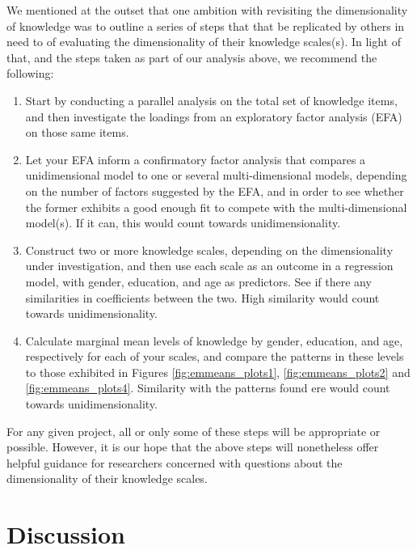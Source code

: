 \documentclass[11pt,halfline,a4paper,]{ouparticle}
\providecommand{\tightlist}{%
  \setlength{\itemsep}{0pt}\setlength{\parskip}{0pt}}
\begin{document}
We mentioned at the outset that one ambition with revisiting the
dimensionality of knowledge was to outline a series of steps that that
be replicated by others in need to of evaluating the dimensionality of
their knowledge scales(s). In light of that, and the steps taken as part
of our analysis above, we recommend the following:

\begin{enumerate}
\def\labelenumi{\arabic{enumi}.}
\tightlist
\item
  Start by conducting a parallel analysis on the total set of knowledge
  items, and then investigate the loadings from an exploratory factor
  analysis (EFA) on those same items.\\
\item
  Let your EFA inform a confirmatory factor analysis that compares a
  unidimensional model to one or several multi-dimensional models,
  depending on the number of factors suggested by the EFA, and in order
  to see whether the former exhibits a good enough fit to compete with
  the multi-dimensional model(s). If it can, this would count towards
  unidimensionality.\\
\item
  Construct two or more knowledge scales, depending on the
  dimensionality under investigation, and then use each scale as an
  outcome in a regression model, with gender, education, and age as
  predictors. See if there any similarities in coefficients between the
  two. High similarity would count towards unidimensionality.\\
\item
  Calculate marginal mean levels of knowledge by gender, education, and
  age, respectively for each of your scales, and compare the patterns in
  these levels to those exhibited in Figures \ref{fig:emmeans_plots1},
  \ref{fig:emmeans_plots2} and \ref{fig:emmeans_plots4}. Similarity with
  the patterns found ere would count towards unidimensionality.
\end{enumerate}

For any given project, all or only some of these steps will be
appropriate or possible. However, it is our hope that the above steps
will nonetheless offer helpful guidance for researchers concerned with
questions about the dimensionality of their knowledge scales.

\hypertarget{discussion}{%
\section{Discussion}\label{discussion}}
\end{document}
